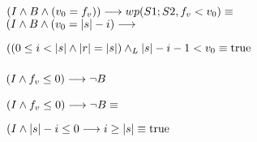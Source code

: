 \documentclass{article}
\begin{document}
$(I \wedge B \wedge (v_{0} = f_{v})) \longrightarrow wp(S1;S2, f_{v} < v_{0}) \equiv$ \\

$(I \wedge B \wedge (v_{0} = |s|-i)\longrightarrow$

$((0 \leq i < |s| \wedge |r| = |s|) \land _L |s|-i-1<v_{0} \equiv \mathrm{true}$

\subsubsection*{$(I \wedge f_{v} \leq 0) \longrightarrow \neg B$}

$(I \wedge f_{v} \leq 0) \longrightarrow \neg B \equiv $

$(I \wedge |s|-i \leq 0 \longrightarrow i \geq |s| \equiv \mathrm{true}$
\end{document}
